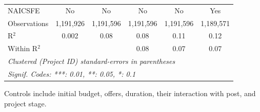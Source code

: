 \documentclass[
]{article}
\begin{document}
\begin{table}[htbp]
\begin{tabular}{lccccc}
      NAICSFE                  & No            & No            & No            & No            & Yes\\  
      Observations             & 1,191,926     & 1,191,596     & 1,191,596     & 1,191,596     & 1,189,571\\  
      R$^2$                    & 0.002         & 0.08          & 0.08          & 0.11          & 0.12\\  
      Within R$^2$             &               &               & 0.08          & 0.07          & 0.07\\  
      \midrule \midrule
      \multicolumn{6}{l}{\emph{Clustered (Project ID) standard-errors in parentheses}}\\
      \multicolumn{6}{l}{\emph{Signif. Codes: ***: 0.01, **: 0.05, *: 0.1}}\\
   \end{tabular}
   
   \par \raggedright 
   Controls include initial budget, offers, duration, their interaction with post, and project stage. 
\end{table}
\end{document}
